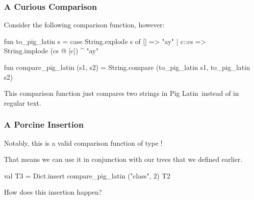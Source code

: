\documentclass[aspectratio=169]{beamer}
\begin{document}
\begin{frame}[fragile]
  \frametitle{A Curious Comparison}

  Consider the following comparison function, however:
  \pause

  \begin{codeblock}
    fun to_pig_latin s =
      case String.explode s of
        [] => "ay"
      | c::cs => String.implode (cs @ [c]) ^ "ay"

    fun compare_pig_latin (s1, s2) =
      String.compare (to_pig_latin s1, to_pig_latin s2)
  \end{codeblock}

  \pause
  \vspace{\fill}

  This comparison function just compares two strings in Pig Latin\footnotemark \, instead of
  in regular text.

\end{frame}

\begin{frame}[fragile]
  \frametitle{A Porcine Insertion}

  Notably, this is a valid comparison function of type !

  \pause
  \vspace{\fill}

  That means we can use it in conjunction with our  trees
  that we defined earlier.

  \pause
  \vspace{\fill}

  \begin{codeblock}
    val T3 = Dict.insert compare_pig_latin ("class", 2) T2
  \end{codeblock}

  \pause
  \vspace{\fill}

  How does this insertion happen?
\end{frame}
\end{document}
